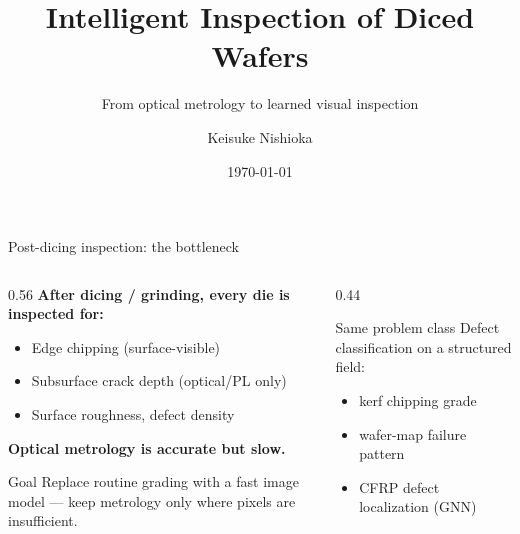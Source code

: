 \documentclass[aspectratio=169,10pt]{beamer}
\title{Intelligent Inspection of Diced Wafers}
\subtitle{From optical metrology to learned visual inspection}
\author{Keisuke Nishioka}
\date{\today}
\begin{document}
\maketitle

\begin{frame}{Post-dicing inspection: the bottleneck}
  \begin{columns}[T]
    \begin{column}{0.56\textwidth}
      \textbf{After dicing / grinding, every die is inspected for:}
      \begin{itemize}
        \item Edge \alert{chipping} (surface-visible)
        \item Subsurface \alert{crack} depth (optical/PL only)
        \item Surface roughness, defect density
      \end{itemize}
      \vspace{2mm}
      \textbf{Optical metrology is accurate but slow.}
      \vspace{2mm}
      \begin{block}{Goal}
        Replace routine grading with a fast image model — keep metrology only
        where pixels are insufficient.
      \end{block}
    \end{column}
    \begin{column}{0.44\textwidth}
      \begin{block}{Same problem class}
        Defect classification on a structured field:
        \begin{itemize}
          \item kerf chipping grade
          \item wafer-map failure pattern
          \item CFRP defect localization (GNN)
        \end{itemize}
      \end{block}
    \end{column}
  \end{columns}
\end{frame}
\end{document}
